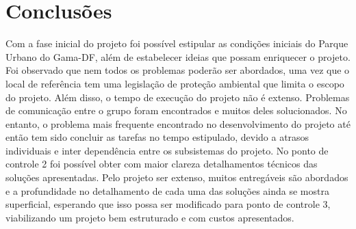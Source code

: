 \chapter[Conclusões]{Conclusões}

	Com a fase inicial do projeto foi possível estipular as condições iniciais do Parque Urbano do Gama-DF, além de estabelecer ideias que possam enriquecer o projeto. Foi observado que nem todos os problemas poderão ser abordados, uma vez que o local de referência tem uma legislação de proteção ambiental que limita o escopo do projeto. Além disso, o tempo de execução do projeto não é extenso. Problemas de comunicação entre o grupo foram encontrados e muitos deles solucionados. No entanto, o problema mais frequente encontrado no desenvolvimento do projeto até então tem sido concluir as tarefas no tempo estipulado, devido a atrasos individuais e inter dependência entre os subsistemas do projeto. No ponto de controle 2 foi possível obter com maior clareza detalhamentos técnicos das soluções apresentadas. Pelo projeto ser extenso, muitos entregáveis são abordados e a profundidade no detalhamento de cada uma das soluções ainda se mostra superficial, esperando que isso possa ser modificado para ponto de controle 3, viabilizando um projeto bem estruturado e com custos apresentados. 